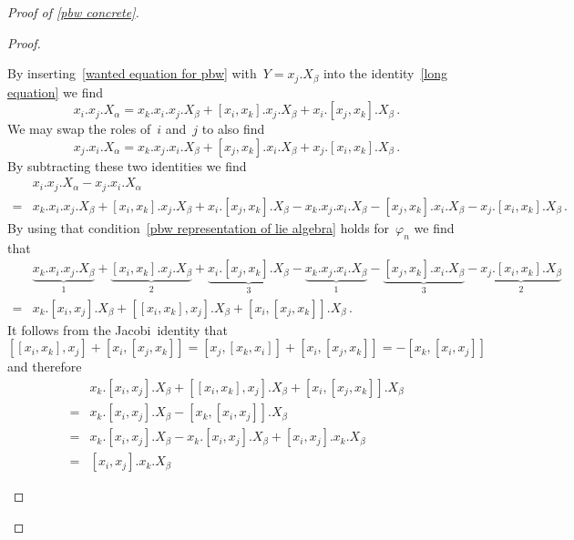 \begin{proof}[Proof of \cref{pbw concrete}]
\begin{proof}
\begin{description}
        By inserting~\eqref{wanted equation for pbw} with~$Y = x_j.X_\beta$ into the identity~\eqref{long equation} we find
        \[
          x_i.x_j.X_\alpha
          =
            x_k.x_i.x_j.X_\beta
          + [x_i, x_k].x_j.X_\beta
          + x_i.[x_j,x_k].X_\beta \,.
        \]
        We may swap the roles of~$i$ and~$j$ to also find
        \[
          x_j.x_i.X_\alpha
          =
            x_k.x_j.x_i.X_\beta
          + [x_j, x_k].x_i.X_\beta
          + x_j.[x_i,x_k].X_\beta \,.
        \]
        By subtracting these two identities we find
        \begin{align*}
          {}&
          x_i.x_j.X_\alpha - x_j.x_i.X_\alpha
          \\
          ={}&
            x_k.x_i.x_j.X_\beta
          + [x_i, x_k].x_j.X_\beta
          + x_i.[x_j,x_k].X_\beta
          - x_k.x_j.x_i.X_\beta
          - [x_j, x_k].x_i.X_\beta
          - x_j.[x_i,x_k].X_\beta \,.
        \end{align*}
        By using that condition~\ref*{pbw representation of lie algebra} holds for~$\varphi_n$ we find that
        \begin{align*}
          {}&
            \underbrace{ x_k.x_i.x_j.X_\beta }_{1}
          + \underbrace{ [x_i, x_k].x_j.X_\beta }_{2}
          + \underbrace{ x_i.[x_j,x_k].X_\beta }_{3}
          - \underbrace{ x_k.x_j.x_i.X_\beta }_{1}
          - \underbrace{ [x_j, x_k].x_i.X_\beta }_{3}
          - \underbrace{ x_j.[x_i,x_k].X_\beta }_{2}
          \\
          ={}&
            x_k.[x_i, x_j].X_\beta
          + [[x_i, x_k], x_j].X_\beta
          + [x_i, [x_j, x_k]].X_\beta \,.
        \end{align*}
        It follows from the Jacobi~identity that
        \[
          [[x_i, x_k], x_j] + [x_i, [x_j, x_k]]
          =
          [x_j, [x_k, x_i]] + [x_i, [x_j, x_k]]
          =
          -[x_k, [x_i, x_j]]
        \]
        and therefore
        \begin{align*}
          {}&
            x_k.[x_i, x_j].X_\beta
          + [[x_i, x_k], x_j].X_\beta
          + [x_i, [x_j, x_k]].X_\beta
          \\
          ={}&
            x_k.[x_i, x_j].X_\beta
          - [x_k, [x_i, x_j]].X_\beta
          \\
          ={}&
            x_k.[x_i, x_j].X_\beta
          - x_k.[x_i, x_j].X_\beta
          + [x_i, x_j].x_k.X_\beta
          \\
          ={}&
          [x_i, x_j].x_k.X_\beta

\end{align*}
\end{description}
\end{proof}
\end{proof}
